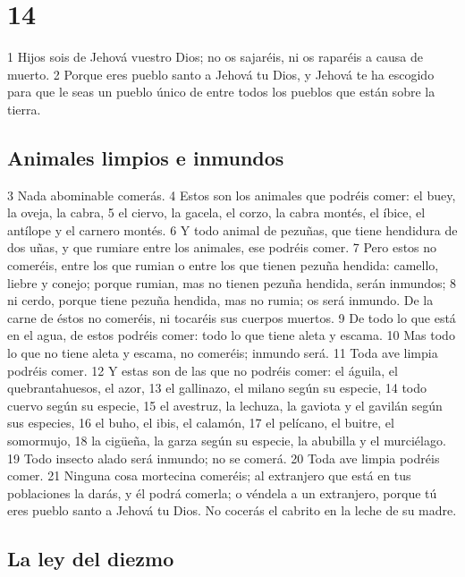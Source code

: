 \chapter{14}

1 Hijos sois de Jehová vuestro Dios; no os sajaréis, ni os raparéis a causa de muerto. 
2 Porque eres pueblo santo a Jehová tu Dios, y Jehová te ha escogido para que le seas un pueblo único de entre todos los pueblos que están sobre la tierra.

\section{Animales limpios e inmundos}

3 Nada abominable comerás.
4 Estos son los animales que podréis comer: el buey, la oveja, la cabra,
5 el ciervo, la gacela, el corzo, la cabra montés, el íbice, el antílope y el carnero montés.
6 Y todo animal de pezuñas, que tiene hendidura de dos uñas, y que rumiare entre los animales, ese podréis comer.
7 Pero estos no comeréis, entre los que rumian o entre los que tienen pezuña hendida: camello, liebre y conejo; porque rumian, mas no tienen pezuña hendida, serán inmundos;
8 ni cerdo, porque tiene pezuña hendida, mas no rumia; os será inmundo. De la carne de éstos no comeréis, ni tocaréis sus cuerpos muertos.
9 De todo lo que está en el agua, de estos podréis comer: todo lo que tiene aleta y escama.
10 Mas todo lo que no tiene aleta y escama, no comeréis; inmundo será.
11 Toda ave limpia podréis comer.
12 Y estas son de las que no podréis comer: el águila, el quebrantahuesos, el azor,
13 el gallinazo, el milano según su especie,
14 todo cuervo según su especie,
15 el avestruz, la lechuza, la gaviota y el gavilán según sus especies, 
16 el buho, el ibis, el calamón,
17 el pelícano, el buitre, el somormujo,
18 la cigüeña, la garza según su especie, la abubilla y el murciélago.
19 Todo insecto alado será inmundo; no se comerá.
20 Toda ave limpia podréis comer.
21 Ninguna cosa mortecina comeréis; al extranjero que está en tus poblaciones la darás, y él podrá comerla; o véndela a un extranjero, porque tú eres pueblo santo a Jehová tu Dios. No cocerás el cabrito en la leche de su madre.

\section{La ley del diezmo}


